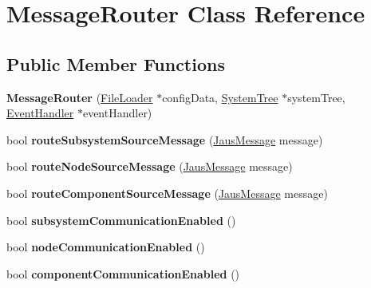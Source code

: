\hypertarget{class_message_router}{\section{\-Message\-Router \-Class \-Reference}
\label{class_message_router}
}
\subsection*{\-Public \-Member \-Functions}
\begin{DoxyCompactItemize}
\item 
\hypertarget{class_message_router_a93511f2d4bfcc5a3081f8cf1b60518b7}{{\bfseries \-Message\-Router} (\hyperlink{class_file_loader}{\-File\-Loader} $\ast$config\-Data, \hyperlink{class_system_tree}{\-System\-Tree} $\ast$system\-Tree, \hyperlink{class_event_handler}{\-Event\-Handler} $\ast$event\-Handler)}\label{class_message_router_a93511f2d4bfcc5a3081f8cf1b60518b7}

\item 
\hypertarget{class_message_router_a2b319de6cb93b902f79e366666fe65d6}{bool {\bfseries route\-Subsystem\-Source\-Message} (\hyperlink{struct_jaus_message_struct}{\-Jaus\-Message} message)}\label{class_message_router_a2b319de6cb93b902f79e366666fe65d6}

\item 
\hypertarget{class_message_router_a9171a158043fdc0d7de350aa7cd49780}{bool {\bfseries route\-Node\-Source\-Message} (\hyperlink{struct_jaus_message_struct}{\-Jaus\-Message} message)}\label{class_message_router_a9171a158043fdc0d7de350aa7cd49780}

\item 
\hypertarget{class_message_router_adc011ce41c4cf4e98ec56eaac7ff9e59}{bool {\bfseries route\-Component\-Source\-Message} (\hyperlink{struct_jaus_message_struct}{\-Jaus\-Message} message)}\label{class_message_router_adc011ce41c4cf4e98ec56eaac7ff9e59}

\item 
\hypertarget{class_message_router_ad799ce52b5b064b8cb0a34a1490f9bcb}{bool {\bfseries subsystem\-Communication\-Enabled} ()}\label{class_message_router_ad799ce52b5b064b8cb0a34a1490f9bcb}

\item 
\hypertarget{class_message_router_a16689ea64c209e5ebec50fcf982d6946}{bool {\bfseries node\-Communication\-Enabled} ()}\label{class_message_router_a16689ea64c209e5ebec50fcf982d6946}

\item 
\hypertarget{class_message_router_aa4dda78a5d76a4e55da9cd8b0da7cf9d}{bool {\bfseries component\-Communication\-Enabled} ()}\label{class_message_router_aa4dda78a5d76a4e55da9cd8b0da7cf9d}

\end{DoxyCompactItemize}
